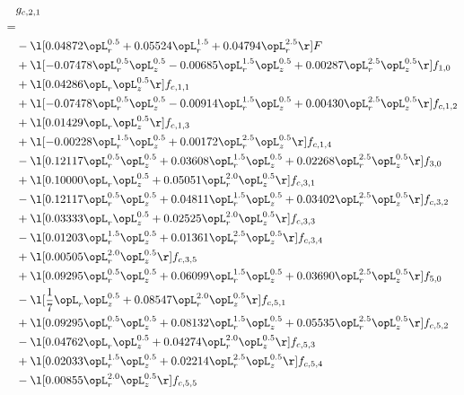 \begin{alignat}{2} 
\label{eq:g_21_0} 
& g_{c,2,1} \nonumber \\ 
 = \\ 
& - \l[  0.04872 \opL_r^{0.5} +  0.05524 \opL_r^{1.5} +  0.04794 \opL_r^{2.5}  \r] F \nonumber \\ 
& + \l[  -0.07478 \opL_r^{0.5} \opL_z^{0.5}   -0.00685 \opL_r^{1.5} \opL_z^{0.5} +  0.00287 \opL_r^{2.5} \opL_z^{0.5}  \r] f_{1,0} \nonumber \\ 
& + \l[  0.04286 \opL_r \opL_z^{0.5}  \r] f_{c,1,1} \nonumber \\ 
& + \l[  -0.07478 \opL_r^{0.5} \opL_z^{0.5}   -0.00914 \opL_r^{1.5} \opL_z^{0.5} +  0.00430 \opL_r^{2.5} \opL_z^{0.5}  \r] f_{c,1,2} \nonumber \\ 
& + \l[  0.01429 \opL_r \opL_z^{0.5}  \r] f_{c,1,3} \nonumber \\ 
& + \l[  -0.00228 \opL_r^{1.5} \opL_z^{0.5} +  0.00172 \opL_r^{2.5} \opL_z^{0.5}  \r] f_{c,1,4} \nonumber \\ 
& - \l[  0.12117 \opL_r^{0.5} \opL_z^{0.5} +  0.03608 \opL_r^{1.5} \opL_z^{0.5} +  0.02268 \opL_r^{2.5} \opL_z^{0.5}  \r] f_{3,0} \nonumber \\ 
& + \l[  0.10000 \opL_r \opL_z^{0.5} +  0.05051 \opL_r^{2.0} \opL_z^{0.5}  \r] f_{c,3,1} \nonumber \\ 
& - \l[  0.12117 \opL_r^{0.5} \opL_z^{0.5} +  0.04811 \opL_r^{1.5} \opL_z^{0.5} +  0.03402 \opL_r^{2.5} \opL_z^{0.5}  \r] f_{c,3,2} \nonumber \\ 
& + \l[  0.03333 \opL_r \opL_z^{0.5} +  0.02525 \opL_r^{2.0} \opL_z^{0.5}  \r] f_{c,3,3} \nonumber \\ 
& - \l[  0.01203 \opL_r^{1.5} \opL_z^{0.5} +  0.01361 \opL_r^{2.5} \opL_z^{0.5}  \r] f_{c,3,4} \nonumber \\ 
& + \l[  0.00505 \opL_r^{2.0} \opL_z^{0.5}  \r] f_{c,3,5} \nonumber \\ 
& + \l[  0.09295 \opL_r^{0.5} \opL_z^{0.5} +  0.06099 \opL_r^{1.5} \opL_z^{0.5} +  0.03690 \opL_r^{2.5} \opL_z^{0.5}  \r] f_{5,0} \nonumber \\ 
& - \l[ \frac{1}{7} \opL_r \opL_z^{0.5} +  0.08547 \opL_r^{2.0} \opL_z^{0.5}  \r] f_{c,5,1} \nonumber \\ 
& + \l[  0.09295 \opL_r^{0.5} \opL_z^{0.5} +  0.08132 \opL_r^{1.5} \opL_z^{0.5} +  0.05535 \opL_r^{2.5} \opL_z^{0.5}  \r] f_{c,5,2} \nonumber \\ 
& - \l[  0.04762 \opL_r \opL_z^{0.5} +  0.04274 \opL_r^{2.0} \opL_z^{0.5}  \r] f_{c,5,3} \nonumber \\ 
& + \l[  0.02033 \opL_r^{1.5} \opL_z^{0.5} +  0.02214 \opL_r^{2.5} \opL_z^{0.5}  \r] f_{c,5,4} \nonumber \\ 
& - \l[  0.00855 \opL_r^{2.0} \opL_z^{0.5}  \r] f_{c,5,5} \nonumber \\ 
\end{alignat} 


